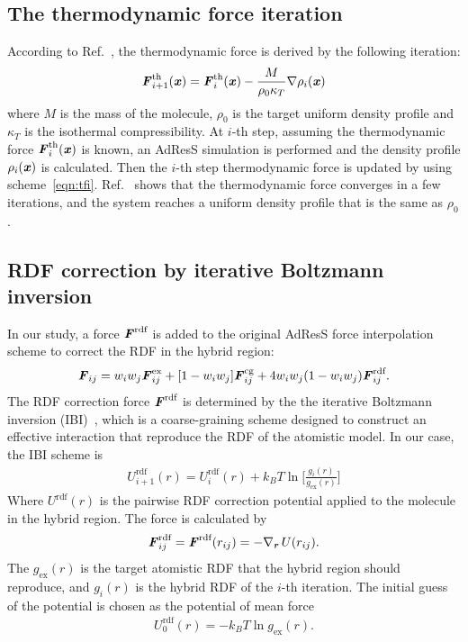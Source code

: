 \documentclass[aps,pre,preprint,unsortedaddress]{revtex4}
\renewcommand{\v}[1]{\textbf{\textit{#1}}}
\begin{document}
\subsection{The thermodynamic force iteration }

According to Ref.~\cite{fritsch2011grand}, the thermodynamic force is derived
by the following iteration:
\begin{align}\label{eqn:tfi}
  \v F^{\textrm{th}}_{i+1}(\v x) = \v F^{\textrm{th}}_i(\v x)
  - \frac{M}{\rho_0\kappa_T}\nabla\rho_i(\v x)
\end{align}
where $M$ is the mass of the molecule, $\rho_0$ is the
target uniform density profile and $\kappa_T$ is the
isothermal compressibility. At $i$-th step, assuming the thermodynamic
force $\v F^{\textrm{th}}_i(\v x)$ is known, an AdResS simulation is
performed and the density profile $\rho_i(\v x)$ is calculated. Then
the $i$-th step thermodynamic force is updated by using
scheme~\eqref{eqn:tfi}.  Ref.~\cite{fritsch2011grand} shows that the
thermodynamic force converges in a few iterations, and the system
reaches a uniform density profile that is the same as $\rho_0$.

\subsection{RDF correction by iterative Boltzmann inversion}

In our study, a force $\v F^{\textrm{rdf}}$ is added to the
original AdResS force interpolation scheme to correct the RDF in
the hybrid region:
\begin{align}
  \v F_{ij} = w_iw_j\v F^{\textrm{ex}}_{ij} + [1-w_iw_j]\v F^{\textrm{cg}}_{ij} +
  4 w_iw_j (1 - w_iw_j)\v F_{ij}^{\textrm{rdf}}.
\end{align}
The RDF correction force $\v F^{\textrm{rdf}}$ is determined by the the
iterative Boltzmann inversion (IBI)~\cite{mueller2002coarse,
  reith2003deriving}, which is a coarse-graining scheme designed to
construct an effective interaction that reproduce the RDF of the
atomistic model. In our case, the IBI scheme is 
\begin{align}\label{eqn:ibi}
  U^{\textrm{rdf}}_{i+1}(r) = U^{\textrm{rdf}}_i(r) +
  k_B T\ln\bigg[
  \frac{g_i(r)}{g_{\textrm{ex}}(r)}
  \bigg]
\end{align}
Where $U^{\textrm{rdf}}(r)$ is the pairwise RDF correction potential
applied to the molecule in the hybrid region. The force is
calculated by
\begin{align}
  \v F^{\textrm{rdf}}_{ij} = \v F^{\textrm{rdf}}(r_{ij})
  = -\nabla_{\v r}\,U(r_{ij}).
\end{align}
The $g_{\textrm{ex}}(r)$ is the target atomistic RDF that the hybrid
region should reproduce, and $g_i(r)$ is the hybrid RDF of the $i$-th
iteration.  The initial guess of the potential is chosen as the
potential of mean force
\begin{align}\label{eqn:pmf}
  U^{\textrm{rdf}}_0(r) = -k_BT \ln g_{\textrm{ex}}(r).
\end{align}
\end{document}
